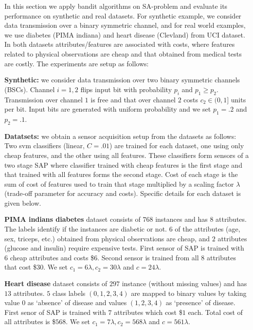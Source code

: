 In this section we apply bandit algorithms on SA-problem and evaluate its performance on synthetic and real datasets. For synthetic example, we consider data transmission over a binary symmetric channel, and for real world examples, we use diabetes (PIMA indiana) and heart disease (Clevland) from UCI dataset. In both datasets attributes/features are associated with costs, where features related to physical observations are cheap and that obtained from medical tests are costly. The experiments are setup as follows:

{\bf Synthetic:} we consider data transmission over two binary symmetric channels (BSCs). Channel $i=1,2$ flips input bit with probability $p_i$ and $p_1\geq p_2$. Transmission over channel $1$ is free and that over channel $2$ costs $ c_2 \in (0,1] $ units per bit. Input bits are generated with uniform probability and we set $p_1=.2$ and $p_2=.1$.

{\bf Datatsets:} we obtain a sensor acquisition setup from the datasets as follows: Two svm classifiers (linear, $C=.01$) are trained for each dataset, one using only cheap features, and the other using all features. These classifiers form sensors of a two stage SAP where classifier trained with cheap features is the first stage and that trained with all features forms the second stage. Cost of each stage is the sum of cost of features used to train that stage multiplied by a scaling factor $\lambda$ (trade-off parameter for accuracy and costs). Specific details for each dataset is given below.  

{\bf PIMA indians diabetes} dataset consists of $768$ instances and has $8$ attributes. The labels identify if the instances are diabetic or not. $6$ of the attributes (age, sex, triceps, etc.) obtained from physical observations are cheap, and $2$ attributes (glucose and insulin) require expensive tests. First sensor of SAP is trained with $6$ cheap attributes and costs \$$6$. Second sensor is trained from all $8$ attributes that cost \$$30$. We set $c_1= 6\lambda, c_2= 30\lambda$ and $c= 24\lambda$.

{\bf Heart disease} dataset consists of $297$ instance (without missing values) and has $13$ attributes. $5$ class labels $(0,1,2,3,4)$ are mapped to binary values by taking value $0$ as `absence' of disease and values $(1,2,3,4)$ as `presence' of disease. First senor of SAP is trained with $7$ attributes which cost  \$$1$ each. Total cost of all attributes is \$$568$. We set $c_1= 7\lambda, c_2= 568\lambda$ and $c= 561\lambda$.

